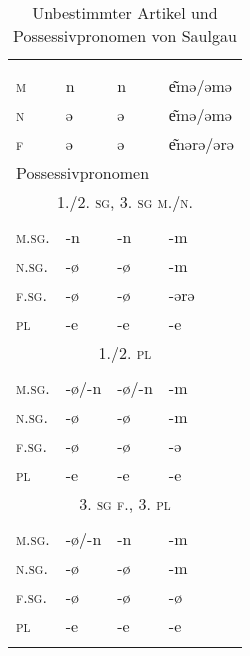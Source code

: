 \begin{table}[H]
	\caption{Unbestimmter Artikel und Possessivpronomen von Saulgau \citep[116-119]{Raichle1932}}\label{table113}
	\begin{tabular}{llll}
		\lsptoprule
		\multicolumn{4}{l}{unbestimmter Artikel}\\
		& \NOM & \AKK & \DAT\\\midrule
		 \textsc{m} & n & n & e͂mǝ/ǝmǝ\\
		 \textsc{n} & ǝ & ǝ & e͂mǝ/ǝmǝ\\
		 \textsc{f} & ǝ & ǝ & e͂nǝrǝ/ǝrǝ\\ \midrule
		\multicolumn{4}{l}{Possessivpronomen}\\
		\multicolumn{4}{c}{\scshape 1./2. \textsc{sg}, 3. \textsc{sg} m./n.}  \\\cmidrule(lr){1-4}
		& \NOM & \AKK & \DAT\\\midrule
		\textsc{m.sg.} & {}-n & {}-n & {}-m\\
		\textsc{n.sg.} & {}-ø & {}-ø & {}-m\\
		\textsc{f.sg.} & {}-ø & {}-ø & {}-ǝrǝ\\
		\textsc{pl} & {}-e & {}-e & {}-e\\ \midrule
		\multicolumn{4}{c}{\scshape 1./2. \textsc{pl}} \\   \cmidrule(lr){1-4}
		& \NOM & \AKK & \DAT\\\midrule
		\textsc{m.sg.} & {}-ø/-n & {}-ø/-n & {}-m\\
		\textsc{n.sg.} & {}-ø & {}-ø & {}-m\\
		\textsc{f.sg.} & {}-ø & {}-ø & {}-ǝ\\
		\textsc{pl} & {}-e & {}-e & {}-e\\ \midrule
		\multicolumn{4}{c}{\scshape 3. \textsc{sg} f., 3. \textsc{pl}} \\ \cmidrule(lr){1-4}
		& \NOM & \AKK & \DAT\\\midrule
		\textsc{m.sg.} & {}-ø/-n & {}-n & {}-m\\
		\textsc{n.sg.} & {}-ø & {}-ø & {}-m\\
		\textsc{f.sg.} & {}-ø & {}-ø & {}-ø\\
		\textsc{pl} & {}-e & {}-e & {}-e\\
		\lspbottomrule
	\end{tabular}
\end{table}


